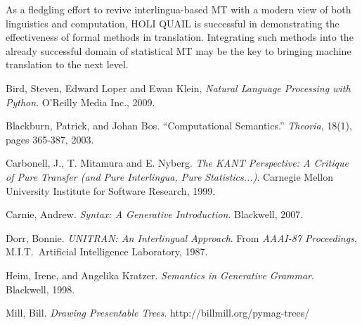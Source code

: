 \documentclass[11pt, oneside]{article}      %
\begin{document}
As a fledgling effort to revive interlingua-based MT with a modern view of both linguistics and computation, HOLI QUAIL is successful in demonstrating the effectiveness of formal methods in translation.  Integrating such methods into the already successful domain of statistical MT may be the key to bringing machine translation to the next level.

\begin{thebibliography}{1}

 Bird, Steven, Edward Loper and Ewan Klein, {\em Natural Language Processing with Python}. O'Reilly Media Inc., 2009.

 Blackburn, Patrick, and Johan Bos.  ``Computational Semantics.''  {\em Theoria}, 18(1), pages 365-387, 2003.

 Carbonell, J., T. Mitamura and E. Nyberg. {\em The KANT Perspective: A Critique of Pure Transfer (and Pure Interlingua, Pure Statistics...)}. Carnegie Mellon University Institute for Software Research, 1999.

 Carnie, Andrew. {\em Syntax: A Generative Introduction}. Blackwell, 2007.

 Dorr, Bonnie. {\em UNITRAN: An Interlingual Approach}. From {\em AAAI-87 Proceedings}, M.I.T.\ Artificial Intelligence Laboratory, 1987.

 Heim, Irene, and Angelika Kratzer.  {\em Semantics in Generative Grammar}.  Blackwell, 1998.

 Mill, Bill.  {\em Drawing Presentable Trees}.  http://billmill.org/pymag-trees/

\end{thebibliography}
\end{document}
